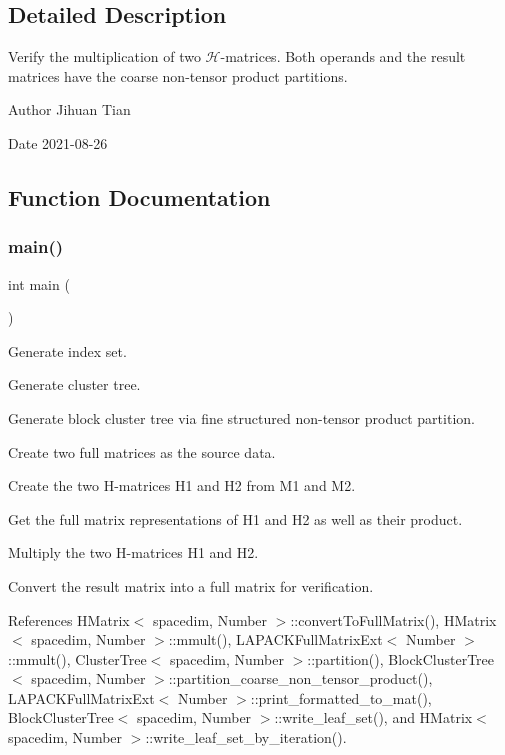 \subsection{Detailed Description}
Verify the multiplication of two $\mathcal{H}$-\/matrices. Both operands and the result matrices have the coarse non-\/tensor product partitions. 

\begin{DoxyAuthor}{Author}
Jihuan Tian 
\end{DoxyAuthor}
\begin{DoxyDate}{Date}
2021-\/08-\/26 
\end{DoxyDate}


\subsection{Function Documentation}
\mbox{\label{hmatrix-hmatrix-mmult-all-coarse-ntp_8cc_ae66f6b31b5ad750f1fe042a706a4e3d4}} 
\subsubsection{\texorpdfstring{main()}{main()}}
{\footnotesize\ttfamily int main (\begin{DoxyParamCaption}{ }\end{DoxyParamCaption})}

Generate index set.

Generate cluster tree.

Generate block cluster tree via fine structured non-\/tensor product partition.

Create two full matrices as the source data.

Create the two H-\/matrices {\ttfamily H1} and {\ttfamily H2} from {\ttfamily M1} and {\ttfamily M2}.

Get the full matrix representations of {\ttfamily H1} and {\ttfamily H2} as well as their product.

Multiply the two H-\/matrices {\ttfamily H1} and {\ttfamily H2}.

Convert the result matrix into a full matrix for verification.

References H\+Matrix$<$ spacedim, Number $>$\+::convert\+To\+Full\+Matrix(), H\+Matrix$<$ spacedim, Number $>$\+::mmult(), L\+A\+P\+A\+C\+K\+Full\+Matrix\+Ext$<$ Number $>$\+::mmult(), Cluster\+Tree$<$ spacedim, Number $>$\+::partition(), Block\+Cluster\+Tree$<$ spacedim, Number $>$\+::partition\+\_\+coarse\+\_\+non\+\_\+tensor\+\_\+product(), L\+A\+P\+A\+C\+K\+Full\+Matrix\+Ext$<$ Number $>$\+::print\+\_\+formatted\+\_\+to\+\_\+mat(), Block\+Cluster\+Tree$<$ spacedim, Number $>$\+::write\+\_\+leaf\+\_\+set(), and H\+Matrix$<$ spacedim, Number $>$\+::write\+\_\+leaf\+\_\+set\+\_\+by\+\_\+iteration().

